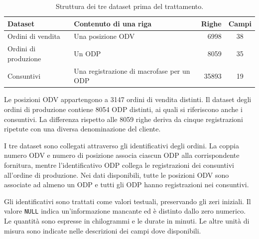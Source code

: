 \begin{table}[htbp]
\centering
\begin{tabularx}{\linewidth}{@{}lXrc@{}}
\toprule
\textbf{Dataset} & \textbf{Contenuto di una riga} & \textbf{Righe} & \textbf{Campi} \\
\midrule
Ordini di vendita & Una posizione ODV & \num{6998} & 38 \\
Ordini di produzione & Un ODP & \num{8059} & 35 \\
Consuntivi & Una registrazione di macrofase per un ODP & \num{35893} & 19 \\
\bottomrule
\end{tabularx}
\caption{Struttura dei tre dataset prima del trattamento.}
\label{tab:updated-datasets}
\end{table}

Le posizioni ODV appartengono a \num{3147} ordini di vendita distinti. Il dataset degli ordini di produzione contiene \num{8054} ODP distinti, ai quali si riferiscono anche i consuntivi. La differenza rispetto alle \num{8059} righe deriva da cinque registrazioni ripetute con una diversa denominazione del cliente.

I tre dataset sono collegati attraverso gli identificativi degli ordini. La coppia numero ODV e numero di posizione associa ciascun ODP alla corrispondente fornitura, mentre l'identificativo ODP collega le registrazioni dei consuntivi all'ordine di produzione. Nei dati disponibili, tutte le posizioni ODV sono associate ad almeno un ODP e tutti gli ODP hanno registrazioni nei consuntivi.

Gli identificativi sono trattati come valori testuali, preservando gli zeri iniziali. Il valore \texttt{NULL} indica un'informazione mancante ed è distinto dallo zero numerico. Le quantità sono espresse in chilogrammi e le durate in minuti. Le altre unità di misura sono indicate nelle descrizioni dei campi dove disponibili.

